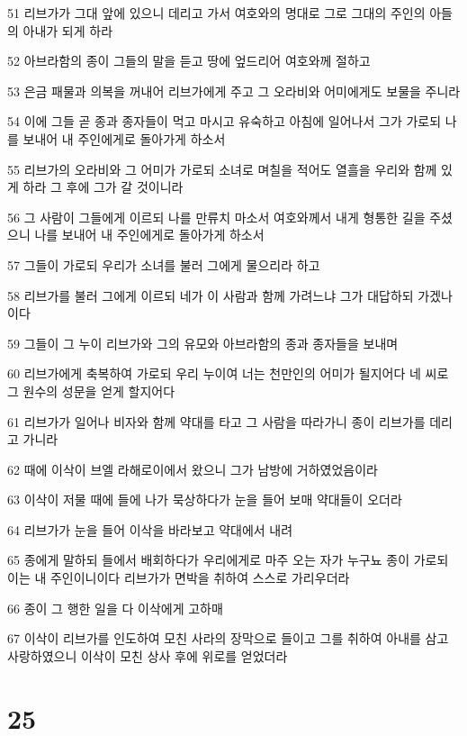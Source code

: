 \par 51 리브가가 그대 앞에 있으니 데리고 가서 여호와의 명대로 그로 그대의 주인의 아들의 아내가 되게 하라
\par 52 아브라함의 종이 그들의 말을 듣고 땅에 엎드리어 여호와께 절하고
\par 53 은금 패물과 의복을 꺼내어 리브가에게 주고 그 오라비와 어미에게도 보물을 주니라
\par 54 이에 그들 곧 종과 종자들이 먹고 마시고 유숙하고 아침에 일어나서 그가 가로되 나를 보내어 내 주인에게로 돌아가게 하소서
\par 55 리브가의 오라비와 그 어미가 가로되 소녀로 며칠을 적어도 열흘을 우리와 함께 있게 하라 그 후에 그가 갈 것이니라
\par 56 그 사람이 그들에게 이르되 나를 만류치 마소서 여호와께서 내게 형통한 길을 주셨으니 나를 보내어 내 주인에게로 돌아가게 하소서
\par 57 그들이 가로되 우리가 소녀를 불러 그에게 물으리라 하고
\par 58 리브가를 불러 그에게 이르되 네가 이 사람과 함께 가려느냐 그가 대답하되 가겠나이다
\par 59 그들이 그 누이 리브가와 그의 유모와 아브라함의 종과 종자들을 보내며
\par 60 리브가에게 축복하여 가로되 우리 누이여 너는 천만인의 어미가 될지어다 네 씨로 그 원수의 성문을 얻게 할지어다
\par 61 리브가가 일어나 비자와 함께 약대를 타고 그 사람을 따라가니 종이 리브가를 데리고 가니라
\par 62 때에 이삭이 브엘 라해로이에서 왔으니 그가 남방에 거하였었음이라
\par 63 이삭이 저물 때에 들에 나가 묵상하다가 눈을 들어 보매 약대들이 오더라
\par 64 리브가가 눈을 들어 이삭을 바라보고 약대에서 내려
\par 65 종에게 말하되 들에서 배회하다가 우리에게로 마주 오는 자가 누구뇨 종이 가로되 이는 내 주인이니이다 리브가가 면박을 취하여 스스로 가리우더라
\par 66 종이 그 행한 일을 다 이삭에게 고하매
\par 67 이삭이 리브가를 인도하여 모친 사라의 장막으로 들이고 그를 취하여 아내를 삼고 사랑하였으니 이삭이 모친 상사 후에 위로를 얻었더라

\chapter{25}

